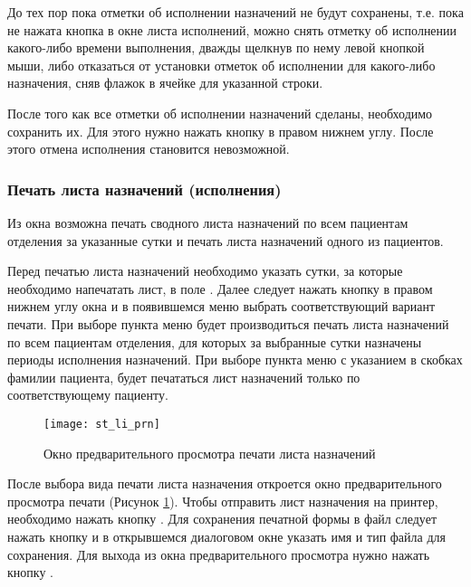 \begin{prim}
 До тех пор пока отметки об исполнении назначений не будут сохранены, т.е. пока не нажата кнопка  в окне листа исполнений, можно снять отметку об исполнении какого-либо времени выполнения, дважды щелкнув по нему левой кнопкой мыши, либо отказаться от установки отметок об исполнении для какого-либо назначения, сняв флажок в ячейке  для указанной строки.
\end{prim}
 
После того как все отметки об исполнении назначений сделаны, необходимо сохранить их. Для этого нужно нажать кнопку  в правом нижнем углу. После этого отмена исполнения становится невозможной.

\subsubsection{Печать листа назначений (исполнения)}

Из окна  возможна печать сводного листа назначений по всем пациентам отделения за указанные сутки и печать листа назначений одного из пациентов.

Перед печатью листа назначений необходимо указать сутки, за которые необходимо напечатать лист, в поле . Далее следует нажать кнопку  в правом нижнем углу окна и в появившемся меню выбрать соответствующий вариант печати. При выборе пункта меню  будет производиться печать листа назначений по всем пациентам отделения, для которых за выбранные сутки назначены периоды исполнения назначений. При выборе пункта меню  с указанием в скобках фамилии пациента, будет печататься лист назначений только по соответствующему пациенту.

\begin{figure}[!ht]\centering
   \texttt{[image: st\_li\_prn]}
   \caption{Окно предварительного просмотра печати листа назначений}
   \label{img_st_li_prn}
\end{figure} 

После выбора вида печати листа назначения откроется окно предварительного просмотра печати (Рисунок \ref{img_st_li_prn}). Чтобы отправить лист назначения на принтер, необходимо нажать кнопку . Для сохранения печатной формы в файл следует нажать кнопку  и в открывшемся диалоговом окне указать имя и тип файла для сохранения. Для выхода из окна предварительного просмотра нужно нажать кнопку .


